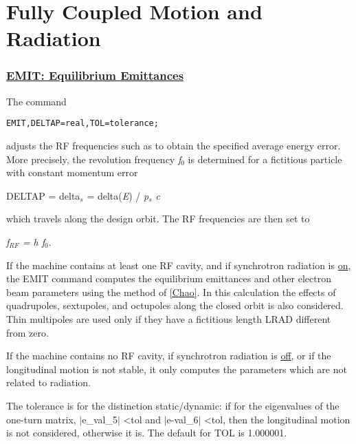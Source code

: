 
\chapter{Fully Coupled Motion and Radiation}

\subsection{\href{emit}{EMIT: Equilibrium Emittances}} 

The command 
\begin{verbatim}
EMIT,DELTAP=real,TOL=tolerance;
\end{verbatim}
adjusts the RF frequencies such as to obtain the specified average energy error. More precisely, the revolution frequency \textit{f$_0$} is determined for a fictitious particle with constant momentum error 

DELTAP = delta$_\textit{s}$ = delta(\textit{E}) / \textit{p$_s$ c}

which travels along the design orbit. The RF frequencies are then set to 

\textit{f$_{RF}$ = h f$_0$}. 

If the machine contains at least one RF cavity, and if synchrotron radiation is \href{../Introduction/beam.html#radiate}{on}, the EMIT command computes the equilibrium emittances and other electron beam parameters using the method of \href{../Introduction/bibliography.html#chao}{[Chao]}. In this calculation the effects of quadrupoles, sextupoles, and octupoles along the closed orbit is also considered. Thin multipoles are used only if they have a fictitious length LRAD  different from zero. 

If the machine contains no RF cavity, if synchrotron radiation is  \href{../Introduction/beam.html#radiate}{off}, or if the longitudinal motion is not stable, it only computes the parameters which are not related to radiation. 

The tolerance is for the distinction static/dynamic: if for the eigenvalues of the one-turn matrix, $|$e\_val\_5$|$ \textless tol and $|$e-val\_6$|$ \textless tol, then the longitudinal motion is not considered, otherwise it is. The default for TOL is 1.000001. 
 
